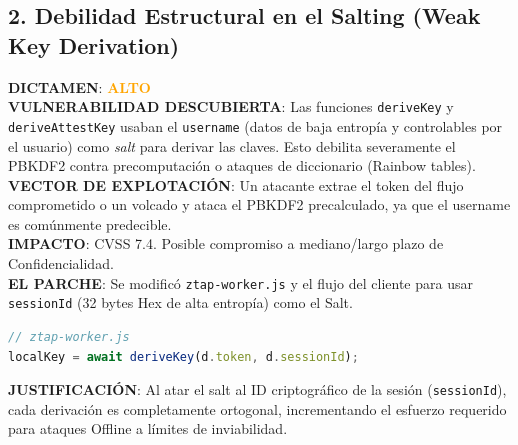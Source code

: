 \documentclass[12pt,a4paper]{article}
\begin{document}
\subsection{2. Debilidad Estructural en el Salting (Weak Key Derivation)}
\textbf{DICTAMEN}: \textcolor{orange}{\textbf{ALTO}}\\
\textbf{VULNERABILIDAD DESCUBIERTA}: Las funciones \texttt{deriveKey} y \texttt{deriveAttestKey} usaban el \texttt{username} (datos de baja entropía y controlables por el usuario) como \textit{salt} para derivar las claves. Esto debilita severamente el PBKDF2 contra precomputación o ataques de diccionario (Rainbow tables).\\
\textbf{VECTOR DE EXPLOTACIÓN}: Un atacante extrae el token del flujo comprometido o un volcado y ataca el PBKDF2 precalculado, ya que el username es comúnmente predecible.\\
\textbf{IMPACTO}: CVSS 7.4. Posible compromiso a mediano/largo plazo de Confidencialidad.\\
\textbf{EL PARCHE}: Se modificó \texttt{ztap-worker.js} y el flujo del cliente para usar \texttt{sessionId} (32 bytes Hex de alta entropía) como el Salt.
\begin{lstlisting}[language=JavaScript]
// ztap-worker.js
localKey = await deriveKey(d.token, d.sessionId);
\end{lstlisting}
\textbf{JUSTIFICACIÓN}: Al atar el salt al ID criptográfico de la sesión (\texttt{sessionId}), cada derivación es completamente ortogonal, incrementando el esfuerzo requerido para ataques Offline a límites de inviabilidad.
\end{document}
